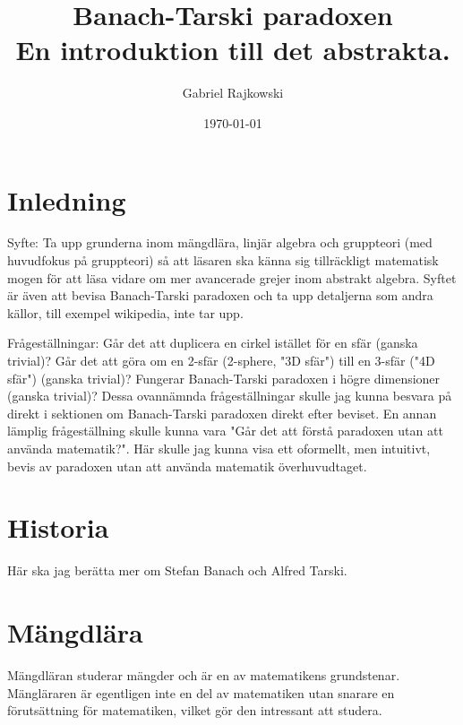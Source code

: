 \documentclass{article}
\theoremstyle{definition}
\begin{document}
\title{%
  Banach-Tarski paradoxen \\
  \small{En introduktion till det abstrakta.}
}
\author{Gabriel Rajkowski}
\date{\today}

\maketitle

\thispagestyle{empty}

\clearpage
\tableofcontents
\section{Inledning}
Syfte: Ta upp grunderna inom mängdlära, linjär algebra och gruppteori (med huvudfokus på gruppteori) 
så att läsaren ska känna sig tillräckligt matematisk mogen för att läsa vidare om mer avancerade grejer inom abstrakt algebra.
Syftet är även att bevisa Banach-Tarski paradoxen och ta upp detaljerna som andra källor, till exempel wikipedia, inte tar upp.

Frågeställningar: Går det att duplicera en cirkel istället för en sfär (ganska trivial)?
Går det att göra om en 2-sfär (2-sphere, "3D sfär") till en 3-sfär ("4D sfär")
(ganska trivial)? Fungerar Banach-Tarski paradoxen i högre dimensioner (ganska trivial)?
Dessa ovannämnda frågeställningar skulle jag kunna besvara på direkt i sektionen
om Banach-Tarski paradoxen direkt efter beviset. En annan lämplig frågeställning skulle 
kunna vara "Går det att förstå paradoxen utan att använda matematik?". Här 
skulle jag kunna visa ett oformellt, men intuitivt, bevis av paradoxen utan att 
använda matematik överhuvudtaget. 

\section{Historia}
Här ska jag berätta mer om Stefan Banach och Alfred Tarski.
\section{Mängdlära}
Mängdläran studerar mängder och är en av matematikens grundstenar. 
\linebreak
Mängläraren är egentligen inte en del av
matematiken utan snarare en förutsättning för matematiken, vilket gör den intressant att studera.
\end{document}
